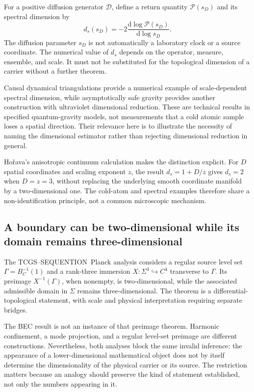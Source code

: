 \documentclass[11pt,a4paper]{article}
\theoremstyle{definition}
\theoremstyle{remark}
\newcommand{\TCGS}{TCGS--SEQUENTION}
\newcommand{\dd}{\mathrm{d}}
\begin{document}
For a positive diffusion generator $\mathcal D$, define a return quantity $\mathcal P(s_D)$ and its spectral dimension by
\begin{equation}
 d_s(s_D)=-2\frac{\dd\log\mathcal P(s_D)}{\dd\log s_D}.
 \label{eq:spectral_dimension}
\end{equation}
The diffusion parameter $s_D$ is not automatically a laboratory clock or a source coordinate. The numerical value of $d_s$ depends on the operator, measure, ensemble, and scale. It must not be substituted for the topological dimension of a carrier without a further theorem.\cite{carlip,planck}

Causal dynamical triangulations provide a numerical example of scale-dependent spectral dimension, while asymptotically safe gravity provides another construction with ultraviolet dimensional reduction. These are technical results in specified quantum-gravity models, not measurements that a cold atomic sample loses a spatial direction. Their relevance here is to illustrate the necessity of naming the dimensional estimator rather than rejecting dimensional reduction in general.\cite{cdt,reuter}

Ho\v rava's anisotropic continuum calculation makes the distinction explicit. For $D$ spatial coordinates and scaling exponent $z$, the result $d_s=1+D/z$ gives $d_s=2$ when $D=z=3$, without replacing the underlying smooth coordinate manifold by a two-dimensional one. The cold-atom and spectral examples therefore share a non-identification principle, not a common microscopic mechanism.\cite{horava}

\subsection{A boundary can be two-dimensional while its domain remains three-dimensional}
The \TCGS\ Planck analysis considers a regular source level set $\Gamma=B_C^{-1}(1)$ and a rank-three immersion $X:\Sigma^3\hookrightarrow C^4$ transverse to $\Gamma$. Its preimage $X^{-1}(\Gamma)$, when nonempty, is two-dimensional, while the associated admissible domain in $\Sigma$ remains three-dimensional. The theorem is a differential-topological statement, with scale and physical interpretation requiring separate bridges.\cite{planck}

The BEC result is not an instance of that preimage theorem. Harmonic confinement, a mode projection, and a regular level-set preimage are different constructions. Nevertheless, both analyses block the same invalid inference: the appearance of a lower-dimensional mathematical object does not by itself determine the dimensionality of the physical carrier or its source. The restriction matters because an analogy should preserve the kind of statement established, not only the numbers appearing in it.\cite{planck}
\end{document}
